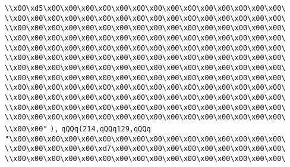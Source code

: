 \verb|\\x00\xd5\x00\x00\x00\x00\x00\x00\x00\x00\x00\x00\x00\x00\x00\x00\|\newline
\verb|\\x00\x00\x00\x00\x00\x00\x00\x00\x00\x00\x00\x00\x00\x00\x00\x00\|\newline
\verb|\\x00\x00\x00\x00\x00\x00\x00\x00\x00\x00\x00\x00\x00\x00\x00\x00\|\newline
\verb|\\x00\x00\x00\x00\x00\x00\x00\x00\x00\x00\x00\x00\x00\x00\x00\x00\|\newline
\verb|\\x00\x00\x00\x00\x00\x00\x00\x00\x00\x00\x00\x00\x00\x00\x00\x00\|\newline
\verb|\\x00\x00\x00\x00\x00\x00\x00\x00\x00\x00\x00\x00\x00\x00\x00\x00\|\newline
\verb|\\x00\x00\x00\x00\x00\x00\x00\x00\x00\x00\x00\x00\x00\x00\x00\x00\|\newline
\verb|\\x00\x00\x00\x00\x00\x00\x00\x00\x00\x00\x00\x00\x00\x00\x00\x00\|\newline
\verb|\\x00\x00\x00\x00\x00\x00\x00\x00\x00\x00\x00\x00\x00\x00\x00\x00\|\newline
\verb|\\x00\x00\x00\x00\x00\x00\x00\x00\x00\x00\x00\x00\x00\x00\x00\x00\|\newline
\verb|\\x00\x00\x00\x00\x00\x00\x00\x00\x00\x00\x00\x00\x00\x00\x00\x00\|\newline
\verb|\\x00\x00\x00\x00\x00\x00\x00\x00\x00\x00\x00\x00\x00\x00\x00\x00\|\newline
\verb|\\x00\x00"|\newline
\verb|),|\newline
\verb|qQQq(214,qQQq129,qQQq|\newline
\verb|"\x00\x00\x00\x00\x00\x00\x00\x00\x00\x00\x00\x00\x00\x00\x00\x00\|\newline
\verb|\\x00\x00\x00\x00\x00\xd7\x00\x00\x00\x00\x00\x00\x00\x00\x00\x00\|\newline
\verb|\\x00\x00\x00\x00\x00\x00\x00\x00\x00\x00\x00\x00\x00\x00\x00\x00\|\newline
